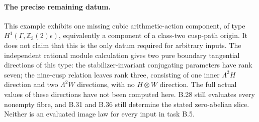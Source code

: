 \paragraph{The precise remaining datum.}
This example exhibits one missing cubic arithmetic-action
component, of type $H^1(\Gamma,\mathbb Z_3(2)\epsilon)$,
equivalently a component of a class-two cusp-path origin.
It does not claim that this is the only datum required
for arbitrary inputs.  The independent rational module
calculation gives two pure boundary tangential directions
of this type: the stabilizer-invariant conjugating
parameters have rank seven; the nine-cusp relation leaves
rank three, consisting of one inner $\Lambda^2H$ direction
and two $\Lambda^2W$ directions, with no $H\otimes W$
direction.  The full actual values of these directions
have not been computed here.  B.28 still evaluates every
nonempty fibre, and B.31 and B.36 still determine the
stated zero-abelian slice.  Neither is an evaluated image
law for every input in task B.5.
